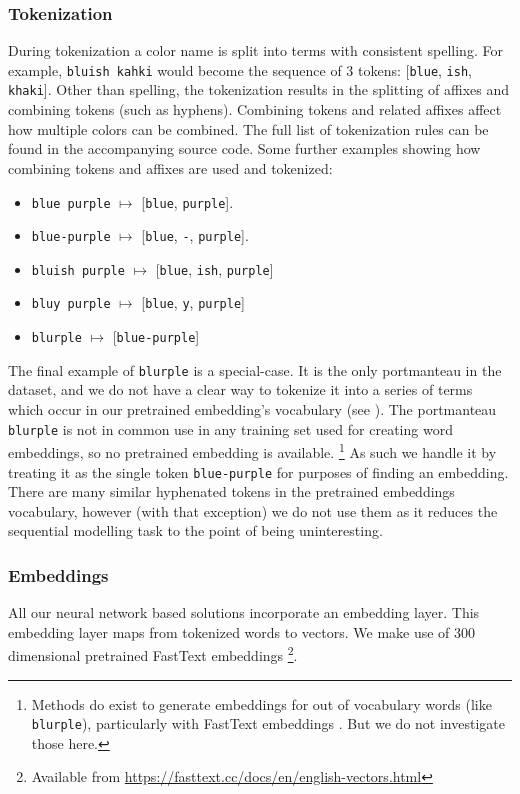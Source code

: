 \documentclass[]{clv3}
\newcommand{\parencite}{\citep}
\newcommand{\natlang}[1]{\texttt{#1}}
\begin{document}
\subsubsection{Tokenization}
During tokenization a color name is split into terms with consistent spelling.
For example, \natlang{bluish kahki} would become the sequence of 3 tokens: [\natlang{blue}, \natlang{ish}, \natlang{khaki}].
Other than spelling, the tokenization results in the splitting of affixes and combining tokens (such as hyphens).
Combining tokens and related affixes affect how multiple colors can be combined.
The full list of tokenization rules can be found in the accompanying source code.
Some further examples showing how combining tokens and affixes are used and tokenized:
\begin{itemize}
	\item \natlang{blue purple} $\mapsto$ [\natlang{blue}, \natlang{purple}].
	\item \natlang{blue-purple} $\mapsto$ [\natlang{blue}, \natlang{-}, \natlang{purple}].
	\item \natlang{bluish purple} $\mapsto$ [\natlang{blue}, \natlang{ish}, \natlang{purple}]
	\item \natlang{bluy purple} $\mapsto$ [\natlang{blue}, \natlang{y}, \natlang{purple}]
	\item \natlang{blurple} $\mapsto$ [\natlang{blue-purple}]
\end{itemize}
The final example of \natlang{blurple} is a special-case.
It is the only portmanteau in the dataset, and we do not have a clear way to tokenize it into a series of terms which occur in our pretrained embedding's vocabulary (see ).
The portmanteau \natlang{blurple} is not in common use in any training set used for creating word embeddings, so no pretrained embedding is available.%
\footnote{Methods do exist to generate embeddings for out of vocabulary words (like \natlang{blurple}), particularly with FastText embeddings \parencite{bojanowski2016enriching}. But we do not investigate those here.}
As such we handle it by treating it as the single token \natlang{blue-purple} for purposes of finding an embedding.
There are many similar hyphenated tokens in the pretrained embeddings vocabulary, however (with that exception) we do not use them as it reduces the sequential modelling task to the point of being uninteresting.

\subsubsection{Embeddings}\label{sec:embeddings} 
All our neural network based solutions incorporate an embedding layer.
This embedding layer maps from tokenized words to vectors.
We make use of 300 dimensional pretrained FastText embeddings \parencite{bojanowski2016enriching}\footnote{Available from \url{https://fasttext.cc/docs/en/english-vectors.html}}.
\end{document}
